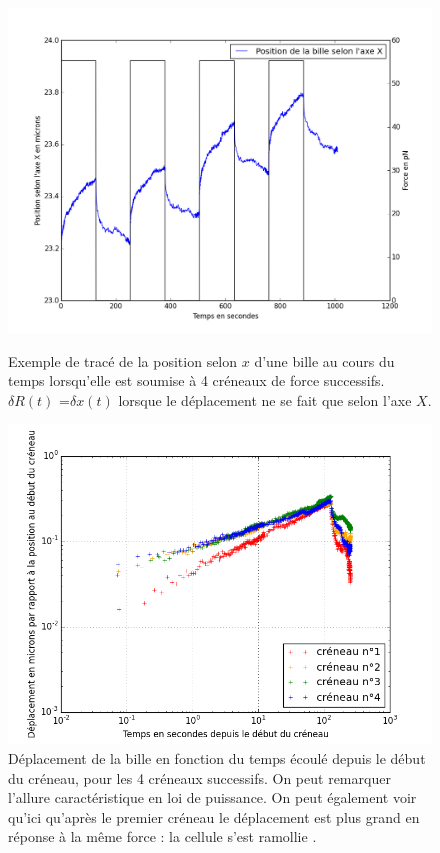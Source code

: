 \documentclass{report}
\begin{document}
\begin{figure}
\includegraphics[scale=0.4]{C162.png}

\caption{Exemple de tracé de la position selon $x$ d'une bille au cours du temps lorsqu'elle est soumise à 4 créneaux de force successifs. $\delta R(t)$ =$\delta x(t)$ lorsque le déplacement ne se fait que selon l'axe $X$.\label{Exemple}} 
	\includegraphics[scale=0.40]{Figures/Exemple_C162_loglog.png}
	\caption{Déplacement de la bille en fonction du temps écoulé depuis le début du créneau, pour les 4 créneaux successifs. On peut remarquer l'allure caractéristique en loi de puissance. On peut également voir qu'ici qu'après le premier créneau le déplacement est plus grand en réponse à la même force : la cellule s'est \og ramollie \fg. }
\end{figure}
\end{document}
